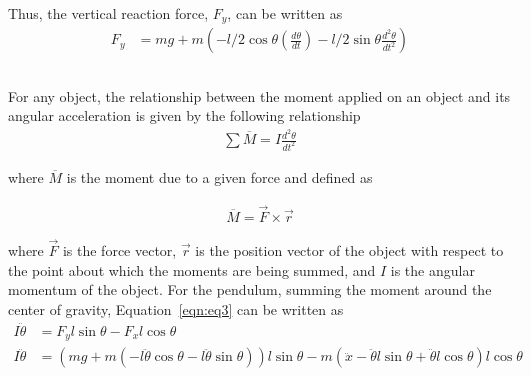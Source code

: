 \documentclass{notes}
\begin{document}
 Thus, the vertical reaction force, $F_y$, can be written as
 \begin{align*}
   F_y & = mg + m\left(-l/2\cos\theta\left(\frac{d\theta}{dt}\right) - l/2\sin\theta\frac{d^2\theta}{dt^2}\right)
 \end{align*}
 \subsection{}
 
 
 For any object, the relationship between the moment applied on an object and its angular acceleration is given by the following relationship
 \begin{align}
   \sum \overline{M} = I\frac{d^2\theta}{dt^2}\label{eqn:eq3}
 \end{align}
 
 where $\overline{M}$ is the moment due to a given force and defined as 
 
 \begin{align*}
   \overline{M} = \vec{F} \times \vec{r}
 \end{align*}
 
 where $\vec{F}$ is the force vector, $\vec{r}$ is the position vector of the object with respect to the point about which the moments are being summed, and $I$ is the angular momentum of the object. For the pendulum, summing the moment around the center of gravity, Equation~\ref{eqn:eq3} can be written as
 \begin{align*}
   I\ddot{\theta} & = F_yl\sin\theta - F_xl\cos\theta \\
   I\ddot{\theta} & = (mg + m(-l\ddot{\theta}\cos\theta - l\ddot{\theta}\sin\theta))l\sin\theta 
   -m(\ddot{x} - \ddot{\theta}l\sin\theta + \ddot{\theta}l\cos\theta)l\cos\theta
 \end{align*}
\end{document}
